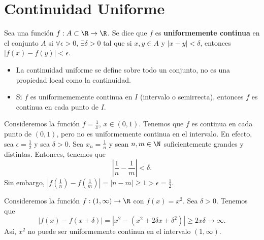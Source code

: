\section{Continuidad Uniforme}
\begin{fdefinition}
\normalfont Sea una función $\displaystyle f: A \subset\R \to \R $. Se dice que $\displaystyle f $ es \textbf{uniformemente continua} en el conjunto $\displaystyle A $ si $\displaystyle \forall \epsilon > 0 $, $\displaystyle \exists \delta > 0 $ tal que si $\displaystyle x,y \in A $ y $\displaystyle \left|x - y\right|<\delta  $, entonces $\displaystyle \left|f\left(x\right)-f\left(y\right)\right| < \epsilon  $.
\end{fdefinition}
\begin{observation}
\normalfont 
\begin{itemize}
\item La continuidad uniforme se define sobre todo un conjunto, no es una propiedad local como la continuidad. 
\item Si $\displaystyle f $ es uniformememente continua en $\displaystyle I $ (intervalo o semirrecta), entonces $\displaystyle f $ es continua en cada punto de $\displaystyle I $.
\end{itemize}
\end{observation}
\begin{eg}
\normalfont Consideremos la función $\displaystyle f = \frac{1}{x} $, $\displaystyle x \in \left(0,1\right) $. Tenemos que $\displaystyle f $ es continua en cada punto de $\displaystyle \left(0,1\right) $, pero no es uniformemente continua en el intervalo. En efecto, sea $\displaystyle \epsilon = \frac{1}{2} $ y sea $\displaystyle \delta > 0 $. Sea $\displaystyle x_{n} = \frac{1}{n} $ y sean $\displaystyle n,m \in \N $ suficientemente grandes y distintas. Entonces, tenemos que
\[ \left|\frac{1}{n}-\frac{1}{m}\right| < \delta  .\]
Sin embargo, $\displaystyle \left|f\left(\frac{1}{n}\right)-f\left(\frac{1}{m}\right)\right| = \left|n - m\right| \geq 1 > \epsilon = \frac{1}{2} $.
\end{eg}
\begin{eg}
\normalfont Consideremos la función $\displaystyle f: \left(1,\infty\right) \to \R $ con $\displaystyle f\left(x\right) = x^{2} $. Sea $\displaystyle \delta > 0 $. Tenemos que
\[ \left|f\left(x\right) - f\left(x + \delta \right)\right| = \left|x^{2} - \left(x^{2} + 2\delta x + \delta^{2}\right)\right| \geq 2x\delta \to \infty .\]
Así, $\displaystyle x^{2} $ no puede ser uniformemente continua en el intervalo $\displaystyle \left(1,\infty\right) $.
\end{eg}
